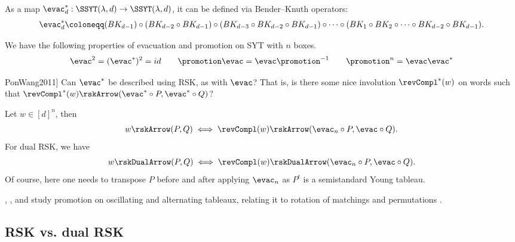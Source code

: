 As a map $\evac_d^* : \SSYT(\lambda,d) \to \SSYT(\lambda,d)$, it
can be defined via Bender--Knuth operators:
\[
\evac_d^*
\coloneqq (BK_{d-1}) \circ (BK_{d-2} \circ BK_{d-1}) \circ (BK_{d-3} \circ BK_{d-2} \circ BK_{d-1})
\circ \dotsb \circ (BK_{1} \circ BK_2 \circ \dotsb \circ BK_{d-2} \circ BK_{d-1}).
\]

We have the following properties of evacuation and promotion on SYT with $n$ boxes.
\[
\evac^2 = (\evac^*)^2 = id \qquad
\promotion \evac = \evac \promotion^{-1} \qquad
\promotion^n  = \evac \evac^*
\]

\begin{problem}[See \cite[Rem.~2.12]{PonWang2011}]
Can $\evac^*$ be described using RSK, as with $\evac$?
That is, is there some nice involution $\revCompl^*(w)$ on words such that
$\revCompl^*(w) \rskArrow (\evac^* \circ P, \evac^* \circ Q)$?
\end{problem}




\begin{proposition}
Let $w \in [d]^n$, then
\[
w \rskArrow (P,Q) \iff \revCompl(w) \rskArrow (\evac_n \circ P, \evac \circ Q).
\]
For dual RSK, we have
\[
w \rskDualArrow (P,Q) \iff  \revCompl(w) \rskDualArrow (\evac_n \circ P, \evac \circ Q).
\]
Of course, here one needs to transpose $P$ before and after applying $\evac_n$
as $P^t$ is a semistandard Young tableau.
\end{proposition}





, , and 
study promotion on oscillating and alternating tableaux, relating it to
rotation of matchings and permutations \cite{PfannererRubeyWestbury2020}.

\subsection[RSKvsDualRSK]{RSK vs. dual RSK}


